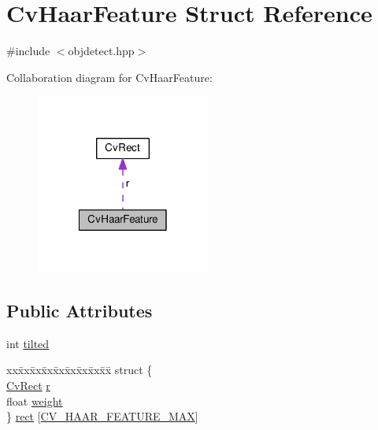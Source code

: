 \hypertarget{structCvHaarFeature}{\section{Cv\-Haar\-Feature Struct Reference}
\label{structCvHaarFeature}
}


{\ttfamily \#include $<$objdetect.\-hpp$>$}



Collaboration diagram for Cv\-Haar\-Feature\-:\nopagebreak
\begin{figure}[H]
\begin{center}
\leavevmode
\includegraphics[width=162pt]{structCvHaarFeature__coll__graph}
\end{center}
\end{figure}
\subsection*{Public Attributes}
\begin{DoxyCompactItemize}
\item 
int \hyperlink{structCvHaarFeature_a8640a958583ac7462cbef6d818025646}{tilted}
\item 
\begin{tabbing}
xx\=xx\=xx\=xx\=xx\=xx\=xx\=xx\=xx\=\kill
struct \{\\
\>\hyperlink{structCvRect}{CvRect} \hyperlink{structCvHaarFeature_a8e045f727beedf2d052ad1a60acb6026}{r}\\
\>float \hyperlink{structCvHaarFeature_a7b402c0924b72d0b4012223a52ca97ab}{weight}\\
\} \hyperlink{structCvHaarFeature_af002d639b8cee0fc1fbdcfbab0aaddc1}{rect} \mbox{[}\hyperlink{objdetect_8hpp_a54d742542c40513ae056b7eca665bd25}{CV\_HAAR\_FEATURE\_MAX}\mbox{]}\\

\end{tabbing}\end{DoxyCompactItemize}


